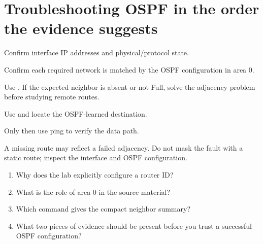 \section{Troubleshooting OSPF in the order the evidence suggests}
\begin{utpsteps}
\item Confirm interface IP addresses and physical/protocol state.
\item Confirm each required network is matched by the OSPF configuration in area 0.
\item Use . If the expected neighbor is absent or not Full, solve the adjacency problem before studying remote routes.
\item Use  and locate the OSPF-learned destination.
\item Only then use ping to verify the data path.
\end{utpsteps}

\begin{pitfall}
A missing route may reflect a failed adjacency. Do not mask the fault with a static route; inspect the interface and OSPF configuration.
\end{pitfall}

\begin{quickcheck}
\begin{enumerate}
\item Why does the lab explicitly configure a router ID?
\item What is the role of area 0 in the source material?
\item Which command gives the compact neighbor summary?
\item What two pieces of evidence should be present before you trust a successful OSPF configuration?
\end{enumerate}
\end{quickcheck}
